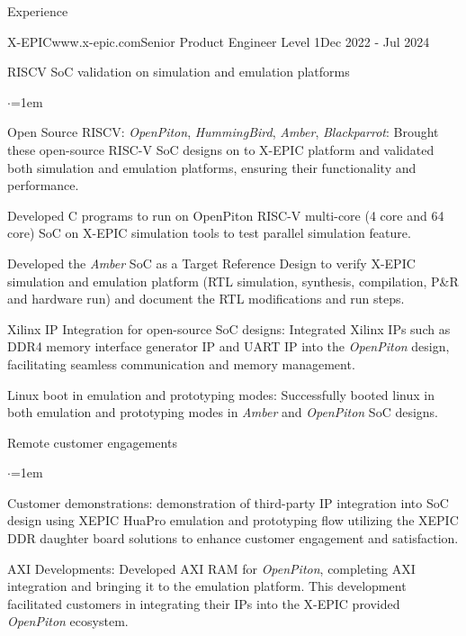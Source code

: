 \documentclass[
11pt, %
]{./assets/resume} %
\begin{document}
\begin{rSection}{Experience}
	\begin{rSubsectionX}{X-EPIC}{www.x-epic.com}{Senior Product Engineer Level 1}{Dec 2022 - Jul 2024}
		\item RISCV SoC validation on simulation and emulation platforms
		\begin{list}{$\cdot$}{\leftmargin=1em}
			\setlength{\itemsep}{-0.5em} \vspace{-0.5em}
			\item Open Source RISCV: \textit{OpenPiton}, \textit{HummingBird}, \textit{Amber}, \textit{Blackparrot}: Brought these open-source RISC-V SoC designs on to X-EPIC platform and validated both simulation and emulation platforms, ensuring their functionality and performance. 
			\item Developed C programs to run on OpenPiton RISC-V multi-core (4 core and 64 core) SoC on X-EPIC simulation tools to test parallel simulation feature.
			\item Developed the \textit{Amber} SoC as a Target Reference Design to verify X-EPIC simulation and emulation platform (RTL simulation, synthesis, compilation, P\&R and hardware run) and document the RTL modifications and run steps.  
			\item Xilinx IP Integration for open-source SoC designs: Integrated Xilinx IPs such as DDR4 memory interface generator IP and UART IP into the \textit{OpenPiton} design, facilitating seamless communication and memory management. 
			\item Linux boot in emulation and prototyping modes: Successfully booted linux in both emulation and prototyping modes in \textit{Amber} and \textit{OpenPiton} SoC designs.
		\end{list}
		\item Remote customer engagements
		\begin{list}{$\cdot$}{\leftmargin=1em}
			\setlength{\itemsep}{-0.5em} \vspace{-0.5em}
			\item Customer demonstrations: demonstration of third-party IP integration into SoC design using XEPIC HuaPro emulation and prototyping flow utilizing the XEPIC DDR daughter board solutions to enhance customer engagement and satisfaction. 
			\item AXI Developments: Developed AXI RAM for \textit{OpenPiton}, completing AXI integration and bringing it to the emulation platform. This development facilitated customers in integrating their IPs into the X-EPIC provided \textit{OpenPiton} ecosystem.

\end{list}
\end{rSubsectionX}
\end{rSection}
\end{document}
